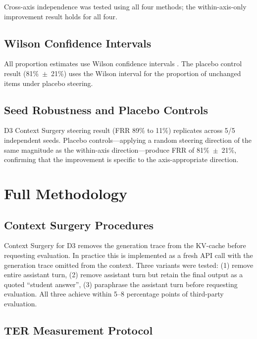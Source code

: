 \documentclass[11pt]{article}
\begin{document}
Cross-axis independence was tested using all four methods; the
within-axis-only improvement result holds for all four.

\subsection{Wilson Confidence Intervals}
\label{app:wilson}

All proportion estimates use Wilson confidence intervals
\citep{wilson1927probable}. The placebo control result
(81\%~$\pm$~21\%) uses the Wilson interval for the proportion of
unchanged items under placebo steering.

\subsection{Seed Robustness and Placebo Controls}
\label{app:seeds}

D3 Context Surgery steering result (FRR 89\% to 11\%) replicates
across 5/5 independent seeds. Placebo controls---applying a random
steering direction of the same magnitude as the within-axis
direction---produce FRR of 81\%~$\pm$~21\%, confirming that the
improvement is specific to the axis-appropriate direction.

\section{Full Methodology}
\label{app:methods}

\subsection{Context Surgery Procedures}
\label{app:surgery}

Context Surgery for D3 removes the generation trace from the KV-cache
before requesting evaluation. In practice this is implemented as a fresh
API call with the generation trace omitted from the context. Three
variants were tested: (1) remove entire assistant turn, (2) remove
assistant turn but retain the final output as a quoted ``student answer'',
(3) paraphrase the assistant turn before requesting evaluation. All three
achieve within 5--8 percentage points of third-party evaluation.

\subsection{TER Measurement Protocol}
\label{app:ter}
\end{document}
